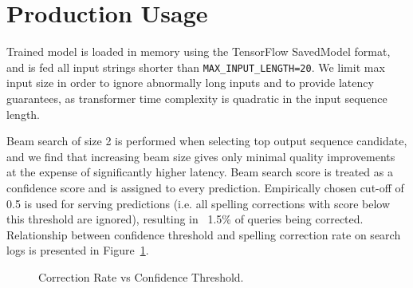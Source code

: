 \documentclass[11pt,a4paper]{article}
\begin{document}
\section{Production Usage}
Trained model is loaded in memory using the TensorFlow \cite{abadi2016tensorflow} SavedModel format, and is fed all input strings shorter than \texttt{MAX\_INPUT\_LENGTH=20}. We limit max input size in order to ignore abnormally long inputs and to provide latency guarantees, as transformer time complexity is quadratic in the input sequence length.

Beam search of size 2 is performed when selecting top output sequence candidate, and we find that increasing beam size gives only minimal quality improvements at the expense of significantly higher latency. Beam search score is treated as a confidence score and is assigned to every prediction. Empirically chosen cut-off of 0.5 is used for serving predictions (i.e. all spelling corrections with score below this threshold are ignored), resulting in ~1.5\% of queries being corrected. Relationship between confidence threshold and spelling correction rate on {\fi} search logs is presented in Figure~\ref{fig:correction_rate}.

\begin{figure}[htbp]
\caption{Correction Rate vs Confidence Threshold.}
\label{fig:correction_rate}
\end{figure}
\end{document}
